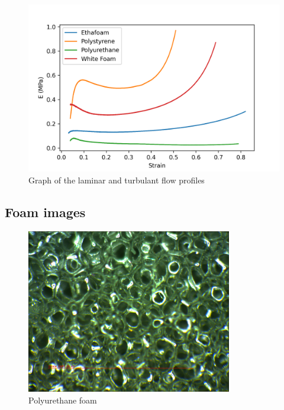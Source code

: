 \documentclass{article}
\begin{document}
\begin{figure}[H]
\centering
\includegraphics[width=1\textwidth]{E_vs_strain.png}
\caption{\label{fig:E_strain} Graph of the laminar and turbulant flow profiles}
\end{figure}


\subsection{Foam images}

\begin{figure}[H]
\centering
\includegraphics[width=0.8\textwidth]{17_polyurethane.png}
\caption{\label{fig:polyurethane} Polyurethane foam}
\end{figure}
\end{document}
